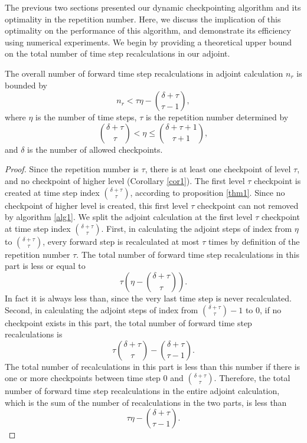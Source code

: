 The previous two sections presented our dynamic checkpointing algorithm and
its optimality in the repetition number.  Here, we discuss the implication
of this optimality on the performance of this algorithm, and demonstrate its
efficiency using numerical experiments.  We begin by providing a theoretical
upper bound on the total number of time step recalculations in our adjoint.

\begin{proposition}
The overall number of forward time step recalculations in adjoint calculation
$n_r$ is bounded by
\begin{equation} \label{ubound}
n_r < \tau \eta - \binom{\delta + \tau}{\tau - 1},
\end{equation}
where $\eta$ is the number of time steps, $\tau$ is the repetition number
determined by
\[ \binom{\delta + \tau}{\tau} < \eta \le \binom{\delta + \tau+1}{\tau+1}, \]
and $\delta$ is the number of allowed checkpoints.
\end{proposition}
\begin{proof}
Since the repetition number is $\tau$, there is at least one checkpoint of
level $\tau$, and no checkpoint of higher level (Corollary \ref{cor1}).  The
first level $\tau$
checkpoint is created at time step index $\binom{\delta + \tau}{\tau}$,
according to proposition \ref{thm1}.  Since no checkpoint of higher level
is created, this first level $\tau$ checkpoint can not removed by algorithm
\ref{alg1}.  We split the adjoint calculation at the first level $\tau$
checkpoint at time step index $\binom{\delta + \tau}{\tau}$.  First, in
calculating the adjoint steps of index from $\eta$ to
$\binom{\delta + \tau}{\tau}$, every forward step is recalculated at most
$\tau$ times by definition of the repetition number $\tau$.  The total number
of forward time step recalculations in this part is less or equal to
\[\tau \left(\eta - \binom{\delta + \tau}{\tau}\right).\]  In fact it is always
less than, since the very last time step is never recalculated.
Second, in calculating the adjoint steps of index from
$\binom{\delta + \tau}{\tau} - 1$ to $0$, if no checkpoint exists in this part,
the total number of forward time step recalculations is \cite[]{griewank00}
\[ \tau \binom{\delta + \tau}{\tau} - \binom{\delta + \tau}{\tau - 1}. \]
The total number of recalculations in this part is less than this number
if there is one or more checkpoints between time step $0$ and
$\binom{\delta + \tau}{\tau}$.  Therefore, the total number of forward time
step recalculations in the entire adjoint calculation, which is the sum of
the number of recalculations in the two parts, is less than
\[ \tau \eta - \binom{\delta + \tau}{\tau - 1}. \]
\end{proof}

